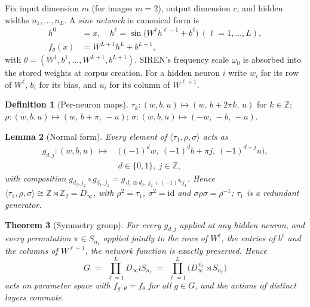 \documentclass[10pt,twocolumn,letterpaper]{article}
\newtheorem{theorem}{Theorem}
\newtheorem{lemma}[theorem]{Lemma}
\theoremstyle{definition}
\newtheorem{definition}[theorem]{Definition}
\newcommand{\Z}{\mathbb{Z}}
\newcommand{\Dinf}{D_\infty}
\begin{document}
Fix input dimension $m$ (for images $m=2$), output dimension $c$, and hidden widths
$n_1,\dots,n_L$. A \emph{sine network} in canonical form is
\begin{equation}
\begin{aligned}
h^0 &= x, \quad h^\ell = \sin\!\big(W^\ell h^{\ell-1} + b^\ell\big)\ (\ell = 1,\dots,L),\\
f_\theta(x) &= W^{L+1} h^L + b^{L+1},
\end{aligned}
\label{eq:siren}
\end{equation}
with $\theta = (W^1,b^1,\dots,W^{L+1},b^{L+1})$. SIREN's frequency scale $\omega_0$
\citep{sitzmann2020siren} is absorbed into the stored weights at corpus creation. For a hidden
neuron $i$ write $w_i$ for its row of $W^\ell$, $b_i$ for its bias, and $u_i$ for its column of
$W^{\ell+1}$.

\begin{definition}[Per-neuron maps]\label{def:gen}
$\tau_k : (w,b,u) \mapsto (w,\, b + 2\pi k,\, u)$ for $k\in\Z$; \quad
$\rho : (w,b,u) \mapsto (w,\, b+\pi,\, -u)$; \quad
$\sigma : (w,b,u) \mapsto (-w,\, -b,\, -u)$.
\end{definition}

\begin{lemma}[Normal form]\label{lem:normal}
Every element of $\langle \tau_1,\rho,\sigma\rangle$ acts as
\begin{equation}
\begin{aligned}
g_{d,j}\colon (w,b,u)\ \longmapsto\ &\big((-1)^d w,\ (-1)^d b + \pi j,\ (-1)^{d+j} u\big),\\
&d \in \{0,1\},\ j\in\Z,
\end{aligned}
\label{eq:normalform}
\end{equation}
with composition $g_{d_2,j_2}\circ g_{d_1,j_1} = g_{\,d_1\oplus d_2,\ j_2 + (-1)^{d_2} j_1}$.
Hence $\langle \tau_1,\rho,\sigma\rangle \cong \Z \rtimes \Z_2 = \Dinf$, with $\rho^2 = \tau_1$,
$\sigma^2 = \mathrm{id}$ and $\sigma\rho\sigma = \rho^{-1}$; $\tau_1$ is a redundant generator.
\end{lemma}

\begin{theorem}[Symmetry group]\label{thm:po1}
For every $g_{d,j}$ applied at any hidden neuron, and every permutation $\pi \in S_{n_\ell}$
applied jointly to the rows of $W^\ell$, the entries of $b^\ell$ and the columns of $W^{\ell+1}$,
the network function is exactly preserved. Hence
\begin{equation}
G \;=\; \prod_{\ell=1}^{L} \Dinf \wr S_{n_\ell}
    \;=\; \prod_{\ell=1}^{L} \big(\Dinf^{\,n_\ell} \rtimes S_{n_\ell}\big)
\end{equation}
acts on parameter space with $f_{g\cdot\theta} = f_\theta$ for all $g\in G$, and the actions of
distinct layers commute.
\end{theorem}
\end{document}
